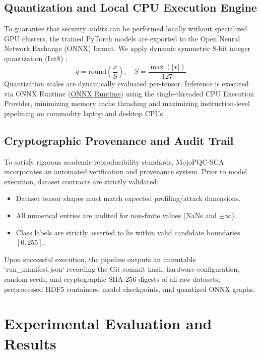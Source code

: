 \documentclass[letterpaper]{article}
\begin{document}
\subsection{Quantization and Local CPU Execution Engine}
To guarantee that security audits can be performed locally without specialized GPU clusters, the trained PyTorch models \cite{paszke2019pytorch} are exported to the Open Neural Network Exchange (ONNX) format. We apply dynamic symmetric 8-bit integer quantization ($\text{Int8}$) \cite{jacob2018quantization,gholami2022survey}:
\begin{equation}
q = \text{round}\left(\frac{x}{S}\right), \quad S = \frac{\max(|x|)}{127}
\label{eq:int8_quant}
\end{equation}
Quantization scales are dynamically evaluated per-tensor. Inference is executed via ONNX Runtime (\href{https://onnxruntime.ai/}{ONNX Runtime}) \cite{onnxruntime2021} using the single-threaded CPU Execution Provider, minimizing memory cache thrashing and maximizing instruction-level pipelining on commodity laptop and desktop CPUs.

\subsection{Cryptographic Provenance and Audit Trail}
To satisfy rigorous academic reproducibility standards, MojoPQC-SCA incorporates an automated verification and provenance system. Prior to model execution, dataset contracts are strictly validated:
\begin{itemize}
    \item Dataset tensor shapes must match expected profiling/attack dimensions.
    \item All numerical entries are audited for non-finite values (NaNs and $\pm \infty$).
    \item Class labels are strictly asserted to lie within valid candidate boundaries $[0, 255]$.
\end{itemize}
Upon successful execution, the pipeline outputs an immutable `run\_manifest.json` recording the Git commit hash, hardware configuration, random seeds, and cryptographic SHA-256 digests of all raw datasets, preprocessed HDF5 containers, model checkpoints, and quantized ONNX graphs.

\section{Experimental Evaluation and Results}
\end{document}

